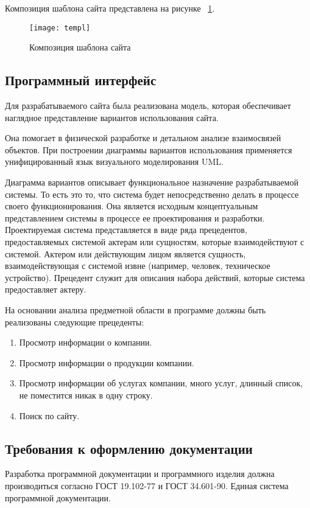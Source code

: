 Композиция шаблона сайта представлена на рисунке ~\ref{templ:image}.

\begin{figure}[ht]
\texttt{[image: templ]}
\caption{Композиция шаблона сайта}
\label{templ:image}
\end{figure}

\subsection{Программный интерфейс}

Для разрабатываемого сайта была реализована модель, которая обеспечивает наглядное представление вариантов использования сайта.

Она помогает в физической разработке и детальном анализе взаимосвязей объектов. При построении диаграммы вариантов использования применяется унифицированный язык визуального моделирования UML.

Диаграмма вариантов описывает функциональное назначение разрабатываемой системы. То есть это то, что система будет непосредственно делать в процессе своего функционирования. Она является исходным концептуальным представлением системы в процессе ее проектирования и разработки. Проектируемая система представляется в виде ряда прецедентов, предоставляемых системой актерам или сущностям, которые взаимодействуют с системой. Актером или действующим лицом является сущность, взаимодействующая с системой извне (например, человек, техническое устройство). Прецедент служит для описания набора действий, которые система предоставляет актеру.

На основании анализа предметной области в программе должны быть реализованы следующие прецеденты:
\begin{enumerate}
\item Просмотр информации о компании.
\item Просмотр информации о продукции компании.
\item Просмотр информации об услугах компании, много услуг, длинный список, не поместится никак в одну строку.
\item Поиск по сайту.
\end{enumerate}

\subsection{Требования к оформлению документации}

Разработка программной документации и программного изделия должна производиться согласно ГОСТ 19.102-77 и ГОСТ 34.601-90. Единая система программной документации.
